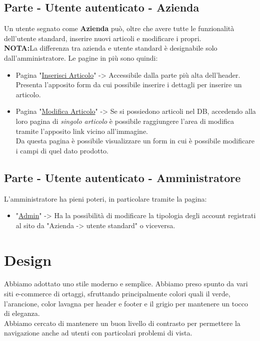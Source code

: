 \subsection{Parte - Utente autenticato - Azienda}
Un utente segnato come \textbf{Azienda} può, oltre che avere tutte le funzionalità dell'utente standard, inserire nuovi articoli e modificare i propri.\\ 
\textbf{NOTA:}La differenza tra azienda e utente standard è designabile solo dall'amministratore.
Le pagine in più sono quindi:
\begin{itemize}
	\item Pagina "\underline{Inserisci Articolo}" -> Accessibile dalla parte più alta dell'header.\\ Presenta l'apposito form da cui possibile inserire i dettagli per inserire un articolo.
	\item Pagina "\underline{Modifica Articolo}" -> Se si possiedono articoli nel DB, accedendo alla loro pagina di \textit{singolo articolo} è possibile raggiungere l'area di modifica tramite l'apposito link vicino all'immagine.\\
	Da questa pagina è possibile visualizzare un form in cui è possibile modificare i campi di quel dato prodotto.
\end{itemize}

\subsection{Parte - Utente autenticato - Amministratore}
L'amministratore ha pieni poteri, in particolare tramite la pagina:
\begin{itemize}
	\item "\underline{Admin}" -> Ha la possibilità di modificare la tipologia degli account registrati al sito da "Azienda -> utente standard" o viceversa.
\end{itemize}

\section{Design}
	Abbiamo adottato uno stile moderno e semplice. Abbiamo preso spunto da vari siti e-commerce di ortaggi, sfruttando principalmente colori quali il verde, l'arancione, color lavagna per header e footer e il grigio per mantenere un tocco di eleganza.\\ Abbiamo cercato di mantenere un buon livello di contrasto per permettere la navigazione anche ad utenti con particolari problemi di vista.

